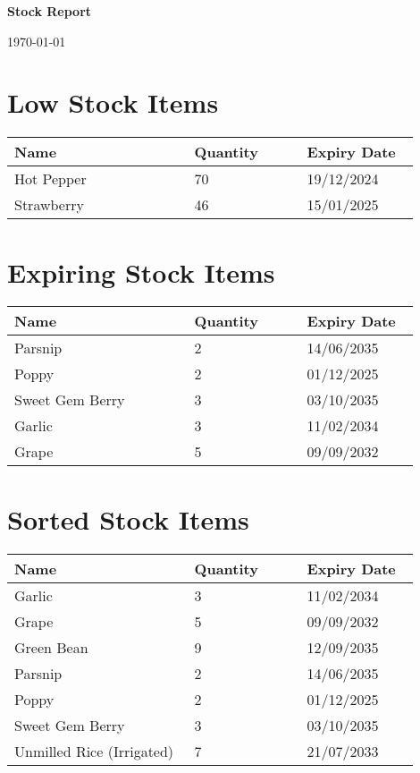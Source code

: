 \documentclass{article}
\begin{document}
\noindent
\begin{minipage}[t]{0.48\textwidth}
	\raggedright
	\LARGE \textbf{Stock Report}
\end{minipage}
\begin{minipage}[t]{0.48\textwidth}
	\raggedleft
	\large \today
\end{minipage}
\vspace{1.5em}
\section*{Low Stock Items}
\begin{longtable}{|p{0.4\linewidth}|p{0.25\linewidth}|p{0.25\linewidth}|}\hline
\textbf{Name} & \textbf{Quantity} & \textbf{Expiry Date}\\
\hline
Hot Pepper & 70 & 19/12/2024 \\
\hline
Strawberry & 46 & 15/01/2025 \\
\hline
\end{longtable}

\section*{Expiring Stock Items}
\begin{longtable}{|p{0.4\linewidth}|p{0.25\linewidth}|p{0.25\linewidth}|}\hline
\textbf{Name} & \textbf{Quantity} & \textbf{Expiry Date}\\
\hline
Parsnip & 2 & 14/06/2035 \\
\hline
Poppy & 2 & 01/12/2025 \\
\hline
Sweet Gem Berry & 3 & 03/10/2035 \\
\hline
Garlic & 3 & 11/02/2034 \\
\hline
Grape & 5 & 09/09/2032 \\
\hline
\end{longtable}

\section*{Sorted Stock Items}
\begin{longtable}{|p{0.4\linewidth}|p{0.25\linewidth}|p{0.25\linewidth}|}\hline
\textbf{Name} & \textbf{Quantity} & \textbf{Expiry Date}\\
\hline
Garlic & 3 & 11/02/2034 \\
\hline
Grape & 5 & 09/09/2032 \\
\hline
Green Bean & 9 & 12/09/2035 \\
\hline
Parsnip & 2 & 14/06/2035 \\
\hline
Poppy & 2 & 01/12/2025 \\
\hline
Sweet Gem Berry & 3 & 03/10/2035 \\
\hline
Unmilled Rice (Irrigated) & 7 & 21/07/2033 \\
\hline
\end{longtable}
\end{document}
